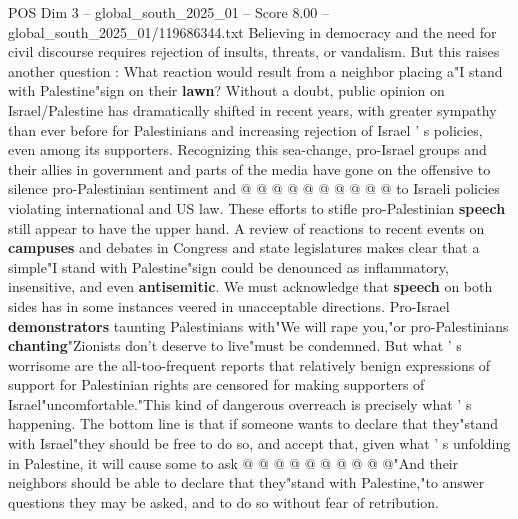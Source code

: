 \begin{textsample}{POS Dim 3 – global\_south\_2025\_01 – Score 8.00 – global\_south\_2025\_01/119686344.txt}
Believing in democracy and the need for civil discourse requires rejection of insults, threats, or vandalism.
But this raises another question : What reaction would result from a neighbor placing a"I stand with Palestine"sign on their \textbf{lawn}?
Without a doubt, public opinion on Israel/Palestine has dramatically shifted in recent years, with greater sympathy than ever before for Palestinians and increasing rejection of Israel ' s policies, even among its supporters.
Recognizing this sea-change, pro-Israel groups and their allies in government and parts of the media have gone on the offensive to silence pro-Palestinian sentiment and @ @ @ @ @ @ @ @ @ @ to Israeli policies violating international and US law.
These efforts to stifle pro-Palestinian \textbf{speech} still appear to have the upper hand.
A review of reactions to recent events on \textbf{campuses} and debates in Congress and state legislatures makes clear that a simple"I stand with Palestine"sign could be denounced as inflammatory, insensitive, and even \textbf{antisemitic}.
We must acknowledge that \textbf{speech} on both sides has in some instances veered in unacceptable directions.
Pro-Israel \textbf{demonstrators} taunting Palestinians with"We will rape you,"or pro-Palestinians \textbf{chanting}"Zionists don't deserve to live"must be condemned.
But what ' s worrisome are the all-too-frequent reports that relatively benign expressions of support for Palestinian rights are censored for making supporters of Israel"uncomfortable."This kind of dangerous overreach is precisely what ' s happening.
The bottom line is that if someone wants to declare that they"stand with Israel"they should be free to do so, and accept that, given what ' s unfolding in Palestine, it will cause some to ask @ @ @ @ @ @ @ @ @ @"And their neighbors should be able to declare that they"stand with Palestine,"to answer questions they may be asked, and to do so without fear of retribution.

\end{textsample}

